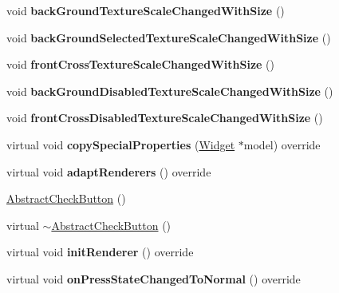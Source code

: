 \begin{DoxyCompactItemize}
void {\bfseries back\+Ground\+Texture\+Scale\+Changed\+With\+Size} ()
\item 
\mbox{\label{classui_1_1AbstractCheckButton_a3abc6c1304a56471f2cdcd810450b46b}} 
void {\bfseries back\+Ground\+Selected\+Texture\+Scale\+Changed\+With\+Size} ()
\item 
\mbox{\label{classui_1_1AbstractCheckButton_a26420a2f79fb04c55743a4a02170c0a5}} 
void {\bfseries front\+Cross\+Texture\+Scale\+Changed\+With\+Size} ()
\item 
\mbox{\label{classui_1_1AbstractCheckButton_ab663acaa710d54639fcb5e51ddb2588a}} 
void {\bfseries back\+Ground\+Disabled\+Texture\+Scale\+Changed\+With\+Size} ()
\item 
\mbox{\label{classui_1_1AbstractCheckButton_ab8f5c74a2c6c11330b2bd4ba8044d628}} 
void {\bfseries front\+Cross\+Disabled\+Texture\+Scale\+Changed\+With\+Size} ()
\item 
\mbox{\label{classui_1_1AbstractCheckButton_afd6c68ee74b6aff6bc3ec41d173e5c12}} 
virtual void {\bfseries copy\+Special\+Properties} (\hyperlink{classui_1_1Widget}{Widget} $\ast$model) override
\item 
\mbox{\label{classui_1_1AbstractCheckButton_a1a93a5f21f7dc207efa99c1c395218a0}} 
virtual void {\bfseries adapt\+Renderers} () override
\item 
\hyperlink{classui_1_1AbstractCheckButton_a951d897f8066270c55a7744951b7eae1}{Abstract\+Check\+Button} ()
\item 
virtual \hyperlink{classui_1_1AbstractCheckButton_a53e936912934087b312f483f554a5ca8}{$\sim$\+Abstract\+Check\+Button} ()
\item 
\mbox{\label{classui_1_1AbstractCheckButton_a491a71a6bf06eccab637d5f1c4de6fe6}} 
virtual void {\bfseries init\+Renderer} () override
\item 
\mbox{\label{classui_1_1AbstractCheckButton_a4fa6b1945b9efd767e9f71dfcc306c89}} 
virtual void {\bfseries on\+Press\+State\+Changed\+To\+Normal} () override

\end{DoxyCompactItemize}
